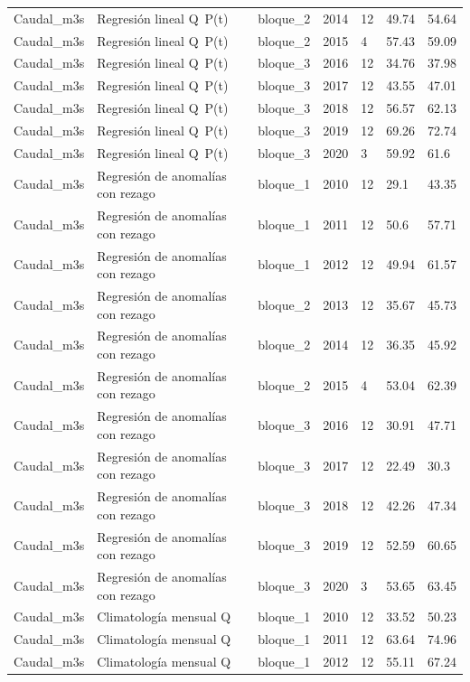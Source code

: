 \begin{longtable}{lllllll}
Caudal\_m3s & Regresión lineal Q~P(t) & bloque\_2 & 2014 & 12 & 49.74 & 54.64 \\
Caudal\_m3s & Regresión lineal Q~P(t) & bloque\_2 & 2015 & 4 & 57.43 & 59.09 \\
Caudal\_m3s & Regresión lineal Q~P(t) & bloque\_3 & 2016 & 12 & 34.76 & 37.98 \\
Caudal\_m3s & Regresión lineal Q~P(t) & bloque\_3 & 2017 & 12 & 43.55 & 47.01 \\
Caudal\_m3s & Regresión lineal Q~P(t) & bloque\_3 & 2018 & 12 & 56.57 & 62.13 \\
Caudal\_m3s & Regresión lineal Q~P(t) & bloque\_3 & 2019 & 12 & 69.26 & 72.74 \\
Caudal\_m3s & Regresión lineal Q~P(t) & bloque\_3 & 2020 & 3 & 59.92 & 61.6 \\
Caudal\_m3s & Regresión de anomalías con rezago & bloque\_1 & 2010 & 12 & 29.1 & 43.35 \\
Caudal\_m3s & Regresión de anomalías con rezago & bloque\_1 & 2011 & 12 & 50.6 & 57.71 \\
Caudal\_m3s & Regresión de anomalías con rezago & bloque\_1 & 2012 & 12 & 49.94 & 61.57 \\
Caudal\_m3s & Regresión de anomalías con rezago & bloque\_2 & 2013 & 12 & 35.67 & 45.73 \\
Caudal\_m3s & Regresión de anomalías con rezago & bloque\_2 & 2014 & 12 & 36.35 & 45.92 \\
Caudal\_m3s & Regresión de anomalías con rezago & bloque\_2 & 2015 & 4 & 53.04 & 62.39 \\
Caudal\_m3s & Regresión de anomalías con rezago & bloque\_3 & 2016 & 12 & 30.91 & 47.71 \\
Caudal\_m3s & Regresión de anomalías con rezago & bloque\_3 & 2017 & 12 & 22.49 & 30.3 \\
Caudal\_m3s & Regresión de anomalías con rezago & bloque\_3 & 2018 & 12 & 42.26 & 47.34 \\
Caudal\_m3s & Regresión de anomalías con rezago & bloque\_3 & 2019 & 12 & 52.59 & 60.65 \\
Caudal\_m3s & Regresión de anomalías con rezago & bloque\_3 & 2020 & 3 & 53.65 & 63.45 \\
Caudal\_m3s & Climatología mensual Q & bloque\_1 & 2010 & 12 & 33.52 & 50.23 \\
Caudal\_m3s & Climatología mensual Q & bloque\_1 & 2011 & 12 & 63.64 & 74.96 \\
Caudal\_m3s & Climatología mensual Q & bloque\_1 & 2012 & 12 & 55.11 & 67.24 \\

\end{longtable}
